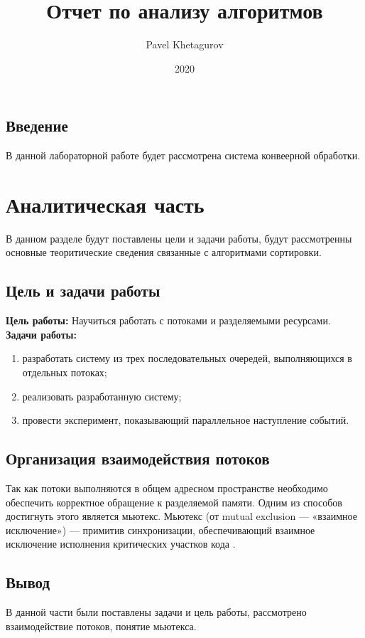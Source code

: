 \documentclass{article}
\title{Отчет по анализу алгоритмов}
\date{2020}
\author{Pavel Khetagurov}
\begin{document}
	
	\newpage
	\tableofcontents
	\newpage
	\begin{center}
	    \section*{Введение}
	\end{center}
		\indent В данной лабораторной работе будет рассмотрена система конвеерной обработки.
	\newpage
	\section{Аналитическая часть}
	В данном разделе будут поставлены цели и задачи работы, будут рассмотренны основные теоритические сведения связанные с алгоритмами сортировки.
		\subsection{Цель и задачи работы}
			\textbf{Цель работы:} Научиться работать с потоками и разделяемыми ресурсами.
			\newline 
			\indent \textbf{Задачи работы:}
			\begin{enumerate}
				\item разработать систему из трех последовательных очередей, выполняющихся в отдельных потоках;
				\item реализовать разработанную систему;
				\item провести эксперимент, показывающий параллельное наступление событий.
			\end{enumerate}

		\subsection{Организация взаимодействия потоков}
		Так как потоки выполняются в общем адресном пространстве необходимо обеспечить корректное обращение к разделяемой памяти. Одним из способов достигнуть этого является мьютекс.
		\newline
		\indent Мьютекс (от mutual exclusion — «взаимное исключение») — примитив синхронизации, обеспечивающий взаимное исключение исполнения критических участков кода \cite{mutex}.
		
	\subsection{Вывод}
	В данной части были поставлены задачи и цель работы, рассмотрено взаимодействие потоков, понятие мьютекса.
	\newpage
\end{document}
